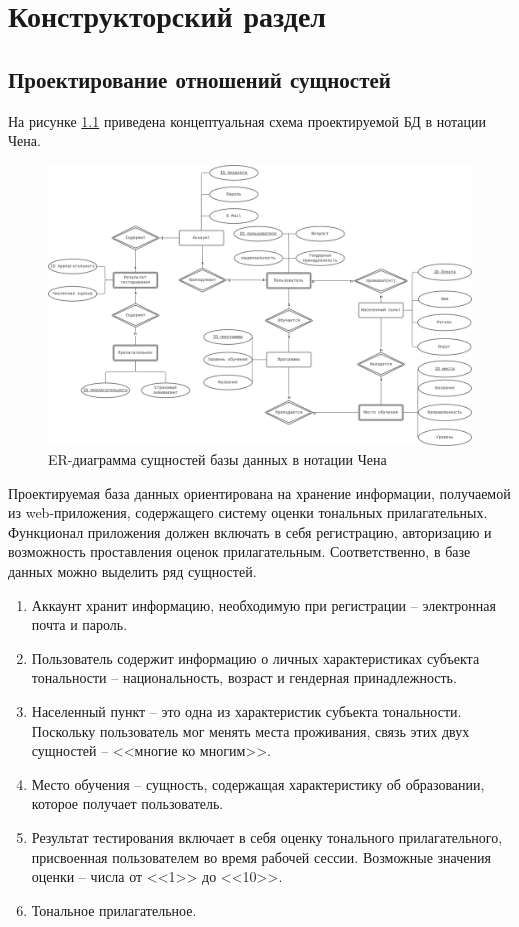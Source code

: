 \chapter{Конструкторский раздел}\label{sec:design}
\section{\protect\justifying\protect\RaggedRight Проектирование отношений сущностей}
На рисунке \ref{fig:chen} приведена концептуальная схема проектируемой БД в нотации Чена. 
\begin{center}
	\begin{figure}[H]
		\centering
		\includegraphics[width=\linewidth]{assets/term-chen.drawio.png}
		\caption{ER-диаграмма сущностей базы данных в нотации Чена}
		\label{fig:chen}
	\end{figure}
\end{center}

Проектируемая база данных ориентирована на хранение информации, получаемой из web-приложения, содержащего систему оценки тональных прилагательных. Функционал приложения должен включать в себя регистрацию, авторизацию и возможность проставления оценок прилагательным. Соответственно, в базе данных можно выделить ряд сущностей. 
\begin{enumerate}
	\item Аккаунт хранит информацию, необходимую при регистрации -- электронная почта и пароль.
	\item Пользователь содержит информацию о личных характеристиках субъекта тональности -- национальность, возраст и гендерная принадлежность. 
	\item Населенный пункт -- это одна из характеристик субъекта тональности. Поскольку пользователь мог менять места проживания, связь этих двух сущностей -- <<многие ко многим>>.
	\item Место обучения -- сущность, содержащая характеристику об образовании, которое получает пользователь.
	\item Результат тестирования включает в себя оценку тонального прилагательного, присвоенная пользователем во время рабочей сессии. Возможные значения оценки -- числа от <<1>> до <<10>>.
	\item Тональное прилагательное.
\end{enumerate} 


